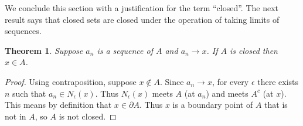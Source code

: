 \documentclass[11pt,oneside]{amsbook}
\newcommand{\R}{\mathbb R}
\renewcommand{\setminus}{\smallsetminus}
\theoremstyle{definition}
\theoremstyle{plain}
\newtheorem{theorem}{Theorem}[section]
\newtheorem{proposition}[theorem]{Proposition}
\theoremstyle{definition}
\newtheorem{definition}[theorem]{Definition}
\theoremstyle{remark}
\numberwithin{equation}{section}
\numberwithin{figure}{section}
\begin{document}
We conclude this section with a justification for the term ``closed''. The next result says that closed sets are closed under the operation of taking limits of sequences.

\begin{theorem}
  Suppose $a_n$ is a sequence of $A$ and $a_n\to x$. If $A$ is closed then $x\in A$.
\end{theorem}

\begin{proof}
  Using contraposition, suppose $x\notin A$. Since $a_n\to x$, for every $\epsilon$ there exists $n$ such that $a_n\in N_\epsilon(x)$. Thus $N_\epsilon(x)$ meets $A$ (at $a_n$) and meets $A^c$ (at $x$). This means by definition that $x\in\partial A$. Thus $x$ is a boundary point of $A$ that is not in $A$, so $A$ is not closed.
\end{proof}


%
%
%
%
%
\end{document}

